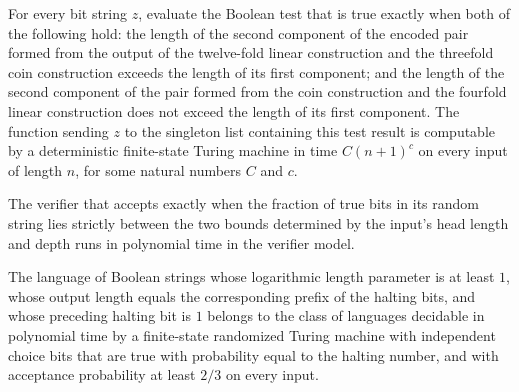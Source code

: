 \begin{theorem}
\label{Randomized.polyTimeComputable_haltCoinTest}
\leanok
{}
For every bit string $z$, evaluate the Boolean test that is true exactly when both of
the following hold: the length of the second component of the encoded pair formed from
the output of the twelve-fold linear construction and the threefold coin construction
exceeds the length of its first component; and the length of the second component of the
pair formed from the coin construction and the fourfold linear construction does not
exceed the length of its first component. The function sending $z$ to the singleton list
containing this test result is computable by a deterministic finite-state Turing machine
in time $C(n+1)^c$ on every input of length $n$, for some natural numbers $C$ and $c$.
\end{theorem}

\begin{theorem}
\label{Randomized.eff_haltCoinVerifier}
\leanok
{}
The verifier that accepts exactly when the fraction of true bits in its random string
lies strictly between the two bounds determined by the input’s head length and depth
runs in polynomial time in the verifier model.
\end{theorem}

\begin{theorem}
\label{Randomized.haltLang_mem_biasedBPP}
\leanok
{}
The language of Boolean strings whose logarithmic length parameter is at least $1$,
whose output length equals the corresponding prefix of the halting bits, and whose
preceding halting bit is $1$ belongs to the class of languages decidable in polynomial
time by a finite-state randomized Turing machine with independent choice bits that are
true with probability equal to the halting number, and with acceptance probability at
least $2/3$ on every input.
\end{theorem}

